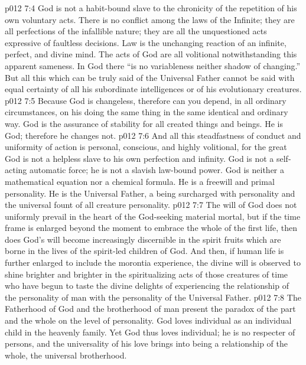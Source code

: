\vs p012 7:4 God is not a habit\hyp{}bound slave to the chronicity of the repetition of his own voluntary acts. There is no conflict among the laws of the Infinite; they are all perfections of the infallible nature; they are all the unquestioned acts expressive of faultless decisions. Law is the unchanging reaction of an infinite, perfect, and divine mind. The acts of God are all volitional notwithstanding this apparent sameness. In God there “is no variableness neither shadow of changing.” But all this which can be truly said of the Universal Father cannot be said with equal certainty of all his subordinate intelligences or of his evolutionary creatures.
\vs p012 7:5 Because God is changeless, therefore can you depend, in all ordinary circumstances, on his doing the same thing in the same identical and ordinary way. God is the assurance of stability for all created things and beings. He is God; therefore he changes not.
\vs p012 7:6 And all this steadfastness of conduct and uniformity of action is personal, conscious, and highly volitional, for the great God is not a helpless slave to his own perfection and infinity. God is not a self\hyp{}acting automatic force; he is not a slavish law\hyp{}bound power. God is neither a mathematical equation nor a chemical formula. He is a freewill and primal personality. He is the Universal Father, a being surcharged with personality and the universal fount of all creature personality.
\vs p012 7:7 \pc The will of God does not uniformly prevail in the heart of the God\hyp{}seeking material mortal, but if the time frame is enlarged beyond the moment to embrace the whole of the first life, then does God’s will become increasingly discernible in the spirit fruits which are borne in the lives of the spirit\hyp{}led children of God. And then, if human life is further enlarged to include the morontia experience, the divine will is observed to shine brighter and brighter in the spiritualizing acts of those creatures of time who have begun to taste the divine delights of experiencing the relationship of the personality of man with the personality of the Universal Father.
\vs p012 7:8 The Fatherhood of God and the brotherhood of man present the paradox of the part and the whole on the level of personality. God loves  individual as an individual child in the heavenly family. Yet God thus loves  individual; he is no respecter of persons, and the universality of his love brings into being a relationship of the whole, the universal brotherhood.
